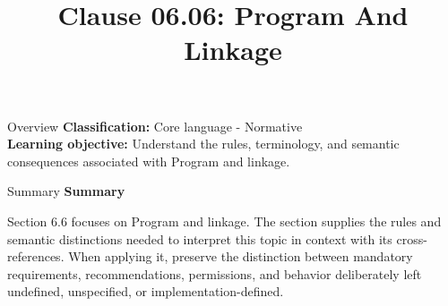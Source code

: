 \documentclass[10pt,letterpaper]{article}
\title{Clause 06.06: Program And Linkage}
\author{}
\date{}
\begin{document}
\maketitle
\begin{CornellOverviewBox}{Overview}
\textbf{Classification:} Core language - Normative\\[2pt]
\textbf{Learning objective:} Understand the rules, terminology, and semantic consequences associated with Program and linkage.
\end{CornellOverviewBox}\begin{CornellSummaryBox}{Summary}
{\sffamily\bfseries\color{Accent} Summary}\par\vspace{3pt}Section 6.6 focuses on Program and linkage. The section supplies the rules and semantic distinctions needed to interpret this topic in context with its cross-references. When applying it, preserve the distinction between mandatory requirements, recommendations, permissions, and behavior deliberately left undefined, unspecified, or implementation-defined.
\end{CornellSummaryBox}
\end{document}
